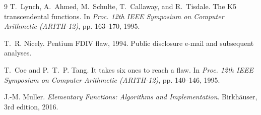 \documentclass[11pt]{article}
\begin{document}
\begin{thebibliography}{9}
T.~Lynch, A.~Ahmed, M.~Schulte, T.~Callaway, and R.~Tisdale.
\newblock The K5 transcendental functions.
\newblock In \emph{Proc. 12th IEEE Symposium on Computer Arithmetic
  (ARITH-12)}, pp. 163--170, 1995.

T.~R. Nicely.
\newblock Pentium FDIV flaw, 1994.
\newblock Public disclosure e-mail and subsequent analyses.

T.~Coe and P.~T.~P. Tang.
\newblock It takes six ones to reach a flaw.
\newblock In \emph{Proc. 12th IEEE Symposium on Computer Arithmetic
  (ARITH-12)}, pp. 140--146, 1995.

J.-M. Muller.
\newblock \emph{Elementary Functions: Algorithms and Implementation}.
\newblock Birkh\"auser, 3rd edition, 2016.

\end{thebibliography}
\end{document}
